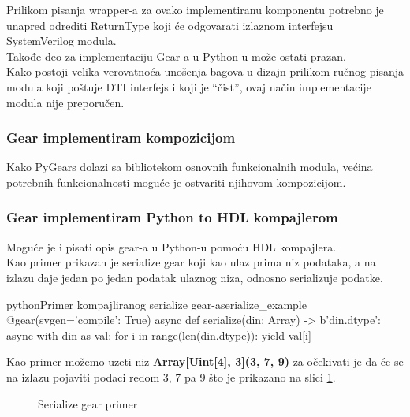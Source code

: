 Prilikom pisanja wrapper-a za ovako implementiranu komponentu potrebno je
unapred odrediti ReturnType koji će odgovarati izlaznom interfejsu SystemVerilog modula. \\
Takođe deo za implementaciju Gear-a u Python-u može ostati prazan. \\

Kako postoji velika verovatnoća unošenja bagova u dizajn prilikom ručnog pisanja
modula koji poštuje DTI interfejs i koji je ``čist'', ovaj način implementacije
modula nije preporučen.

\subsubsection{Gear implementiram kompozicijom}

Kako PyGears dolazi sa bibliotekom osnovnih funkcionalnih modula, većina
potrebnih funkcionalnosti moguće je ostvariti njihovom kompozicijom. \\

\newpage

\subsubsection{Gear implementiram Python to HDL kompajlerom}

Moguće je i pisati opis gear-a u Python-u pomoću HDL kompajlera. \\

Kao primer prikazan je serialize gear koji kao ulaz prima niz podataka, a na
izlazu daje jedan po jedan podatak ulaznog niza, odnosno serializuje podatke.

\begin{code}[H]{python}{Primer kompajliranog serialize gear-a}{serialize_example}
@gear(svgen={'compile': True})
async def serialize(din: Array) -> b'din.dtype':
    async with din as val:
        for i in range(len(din.dtype)):
            yield val[i]
\end{code}

Kao primer možemo uzeti niz \textbf{Array[Uint[4], 3](3, 7, 9)} za očekivati je da će se
na izlazu pojaviti podaci redom 3, 7 pa 9 što je prikazano na slici \ref{serialize_example2}.
\begin{figure}[H]
\centering{
  \resizebox{.55\textwidth}{!}{%
    
  }}
\caption{Serialize gear primer}
\label{serialize_example2}
\end{figure}
